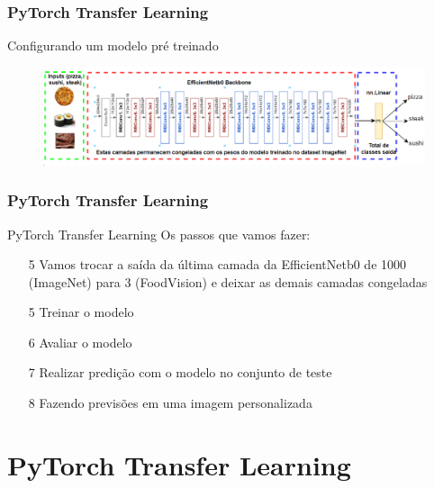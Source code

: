\documentclass{beamer}
\begin{document}
\begin{frame}
	\frametitle{PyTorch Transfer Learning}
	\begin{block}{Configurando um modelo pré treinado}
	\begin{figure}
		\centering
		\includegraphics[width=1\linewidth]{figures/transfer_learning01}
	\end{figure}
		
	\end{block}
\end{frame} 

\begin{frame}
	\frametitle{PyTorch Transfer Learning}
	\begin{block}{PyTorch Transfer Learning}
		Os passos que vamos fazer:
		\begin{itemize}
			\item[5] Vamos trocar a saída da última camada da EfficientNetb0 de 1000 (ImageNet) para 3 (FoodVision) e deixar as demais camadas congeladas
			\item[5] Treinar o modelo
			\item[6] Avaliar o modelo
			\item[7] Realizar predição com o modelo no conjunto de teste
			\item[8] Fazendo previsões em uma imagem personalizada
		\end{itemize}
	\end{block}
\end{frame} 

\section{PyTorch Transfer Learning}
\end{document}
